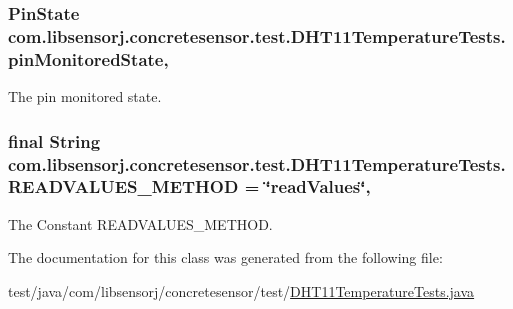\subsubsection[{pin\+Monitored\+State}]{\setlength{\rightskip}{0pt plus 5cm}Pin\+State com.\+libsensorj.\+concretesensor.\+test.\+D\+H\+T11\+Temperature\+Tests.\+pin\+Monitored\+State\hspace{0.3cm}{\ttfamily [static]}, {\ttfamily [private]}}\label{classcom_1_1libsensorj_1_1concretesensor_1_1test_1_1DHT11TemperatureTests_a0b1e8ff10deeef685ecc52fe4254e239}
The pin monitored state. \hypertarget{classcom_1_1libsensorj_1_1concretesensor_1_1test_1_1DHT11TemperatureTests_a2e6886cd64d8982ff792d10404bca66f}{}
\subsubsection[{R\+E\+A\+D\+V\+A\+L\+U\+E\+S\+\_\+\+M\+E\+T\+H\+O\+D}]{\setlength{\rightskip}{0pt plus 5cm}final String com.\+libsensorj.\+concretesensor.\+test.\+D\+H\+T11\+Temperature\+Tests.\+R\+E\+A\+D\+V\+A\+L\+U\+E\+S\+\_\+\+M\+E\+T\+H\+O\+D = \char`\"{}read\+Values\char`\"{}\hspace{0.3cm}{\ttfamily [static]}, {\ttfamily [private]}}\label{classcom_1_1libsensorj_1_1concretesensor_1_1test_1_1DHT11TemperatureTests_a2e6886cd64d8982ff792d10404bca66f}
The Constant R\+E\+A\+D\+V\+A\+L\+U\+E\+S\+\_\+\+M\+E\+T\+H\+O\+D. 

The documentation for this class was generated from the following file\+:\begin{DoxyCompactItemize}
\item 
test/java/com/libsensorj/concretesensor/test/\hyperlink{DHT11TemperatureTests_8java}{D\+H\+T11\+Temperature\+Tests.\+java}\end{DoxyCompactItemize}
